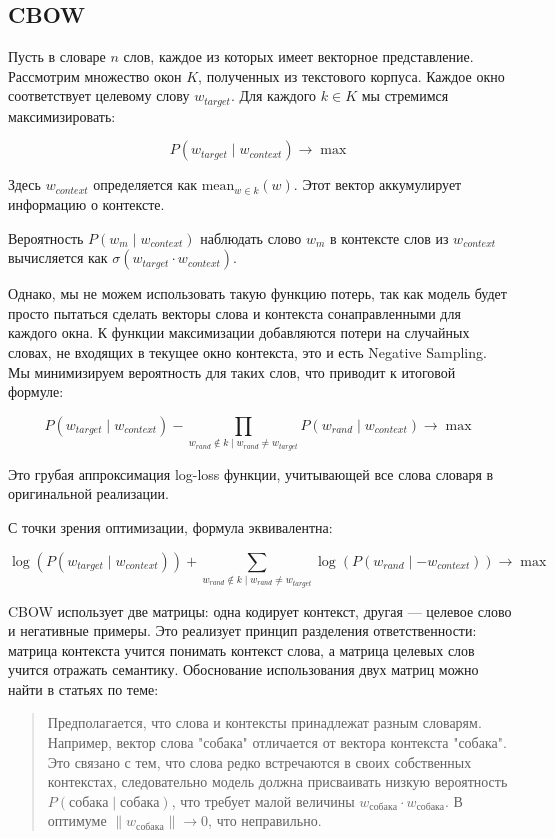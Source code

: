 \documentclass{article}
\begin{document}
    \subsection{CBOW}  
    Пусть в словаре \( n \) слов, каждое из которых имеет векторное представление. Рассмотрим множество окон \( K \), полученных из текстового корпуса. Каждое окно соответствует целевому слову \( w_{target} \). Для каждого \( k \in K \) мы стремимся максимизировать:  
    
    \[
    P(w_{target} \mid w_{context}) \rightarrow \max
    \]  
    
    Здесь \( w_{context} \) определяется как \( \text{mean}_{w \in k}(w) \). Этот вектор аккумулирует информацию о контексте.  
    
    Вероятность \( P(w_m \mid w_{context}) \) наблюдать слово \( w_m \) в контексте слов из \( w_{context} \) вычисляется как \( \sigma(w_{target} \cdot w_{context}) \).  
    
    Однако, мы не можем использовать такую функцию потерь, так как модель будет просто пытаться сделать векторы слова и контекста сонаправленными для каждого окна. 
    К функции максимизации добавляются потери на случайных словах, не входящих в текущее окно контекста, это и есть Negative Sampling. Мы минимизируем вероятность для таких слов, что приводит к итоговой формуле:  
    
    \[
    P(w_{target} \mid w_{context}) - \prod_{w_{rand} \notin k \mid w_{rand} \neq w_{target}} P(w_{rand} \mid w_{context}) \rightarrow \max
    \]  
    
    Это грубая аппроксимация log-loss функции, учитывающей все слова словаря в оригинальной реализации.  
    
    С точки зрения оптимизации, формула эквивалентна:  
    
    \[
    \log(P(w_{target} \mid w_{context})) + \sum_{w_{rand} \notin k \mid w_{rand} \neq w_{target}} \log(P(w_{rand} \mid -w_{context})) \rightarrow \max
    \]  
    
    CBOW использует две матрицы: одна кодирует контекст, другая — целевое слово и негативные примеры. Это реализует принцип разделения ответственности:  
    матрица контекста учится понимать контекст слова, а матрица целевых слов учится отражать семантику.  
    Обоснование использования двух матриц можно найти в статьях по теме:  
    
    \begin{quote}  
    Предполагается, что слова и контексты принадлежат разным словарям. 
    Например, вектор слова "собака" отличается от вектора контекста "собака". 
    Это связано с тем, что слова редко встречаются в своих собственных контекстах, 
    следовательно модель должна присваивать 
    низкую вероятность \( P(\text{собака} \mid \text{собака}) \), что требует 
    малой величины \( w_{собака} \cdot w_{собака} \). В оптимуме \( \|w_{собака}\| \rightarrow 0 \), что неправильно.  
    \end{quote}  
\end{document}
